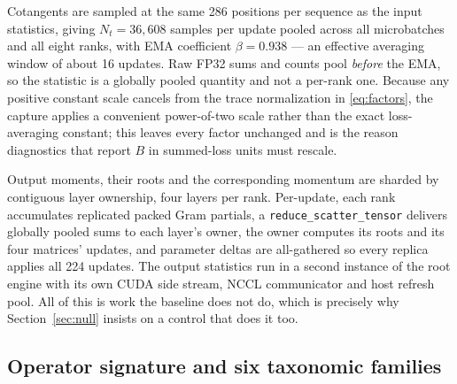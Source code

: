 Cotangents are sampled at the same 286 positions per sequence as the input
statistics, giving $N_t=36{,}608$ samples per update pooled across all
microbatches and all eight ranks, with EMA coefficient $\beta=0.938$ --- an
effective averaging window of about 16 updates. Raw FP32 sums and counts pool
\emph{before} the EMA, so the statistic is a globally pooled quantity and not a
per-rank one. Because any positive constant scale cancels from the trace
normalization in \eqref{eq:factors}, the capture applies a convenient power-of-two
scale rather than the exact loss-averaging constant; this leaves every factor
unchanged and is the reason diagnostics that report $B$ in summed-loss units
must rescale.

Output moments, their roots and the corresponding momentum are sharded by
contiguous layer ownership, four layers per rank. Per-update, each rank
accumulates replicated packed Gram partials, a \verb|reduce_scatter_tensor|
delivers globally pooled sums to each layer's owner, the owner computes its
roots and its four matrices' updates, and parameter deltas are all-gathered so
every replica applies all 224 updates. The output statistics run in a second
instance of the root engine with its own CUDA side stream, NCCL communicator
and host refresh pool. All of this is work the baseline does not do, which is
precisely why Section~\ref{sec:null} insists on a control that does it too.

\subsection{Operator signature and six taxonomic families}
\label{sec:taxonomy}


